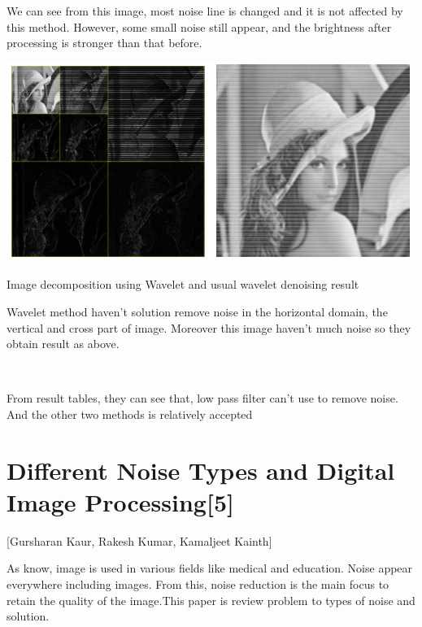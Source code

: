 We can see from this image, most noise line is changed and it is not affected by this method.  However, some small noise still appear, and the brightness after processing is stronger than that before. 
\vspace{2cm}

\begin{center}
\includegraphics{wave.png}

Image decomposition using Wavelet and usual wavelet denoising result
\end{center}
Wavelet method  haven't solution remove noise in the horizontal domain, the vertical and cross part of image. Moreover this image haven't much noise so they obtain result as above. 

\

From result tables, they can see that, low pass filter can't use to remove noise. And the other two methods is relatively accepted
\vspace{1.5cm}

\section{Different Noise Types and Digital Image Processing[5]}
[Gursharan Kaur, Rakesh Kumar, Kamaljeet Kainth]


As know, image is used in various fields like medical and education. Noise appear everywhere including images. From this, noise reduction is the main focus to retain the quality of the image.This paper is review problem to types of noise and solution.

